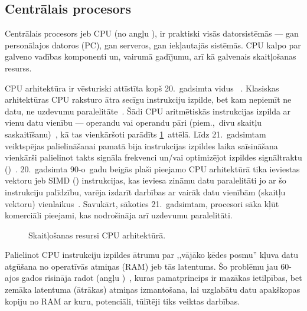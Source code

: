 \subsection{Centrālais procesors} \label{sec:cpu}
Centrālais procesors jeb CPU (no angļu ), ir
praktiski visās datorsistēmās --- gan personālajos datoros (PC), gan serveros,
gan iekļautajās sistēmās. CPU kalpo par galveno vadības komponenti un, vairumā
gadījumu, arī kā galvenais skaitļošanas resurss.

CPU arhitektūra ir vēsturiski attīstīta kopš 20.~gadsimta vidus~%
\cite{Flynn-arch}\cite{von-Neumann}.
Klasiskas arhitektūras CPU raksturo ātra secīgu instrukciju izpilde, 
bet kam nepiemīt ne datu, ne uzdevumu paralelitāte~\cite{Owens-GPU}.
Šādi CPU aritmētiskās instrukcijas izpilda ar vienu datu vienību --- 
operandu vai operandu pāri (piem.,~divu skaitļu saskaitīšanu)~\cite{Flynn-arch},
kā tas vienkāršoti parādīts \ref{fig:cpu-arch}~attēlā.
Līdz 21.~gadsimtam veiktspējas palielināšanai pamatā bija 
instrukcijas izpildes laika saīsināšana vienkārši 
palielinot takts signāla frekvenci
un/vai optimizējot izpildes signāltraktu ()~\cite{Flynn-arch}.
20.~gadsimta 90-o~gadu beigās plaši pieejamo CPU arhitektūrā tika ieviestas
vektoru jeb SIMD () 
instrukcijas, kas ieviesa zināmu datu paralelitāti jo ar šo instrukciju
palīdzību, varēja izdarīt darbības ar vairāk datu vienībām (skaitļu vektoru)
vienlaikus~\cite{SIMD}.
Savukārt, sākoties 21.~gadsimtam,  procesori
sāka kļūt komerciāli pieejami, kas nodrošināja arī uzdevumu paralelitāti.

\begin{figure}[tbh]
	\centering
	\def\svgscale{1.2}
	{}
	\caption{Skaitļošanas resursi CPU arhitektūrā.}
	\label{fig:cpu-arch}
\end{figure}

\label{sec:cache}
Palielinot CPU instrukciju izpildes ātrumu par
,,vājāko ķēdes posmu'' kļuva datu atgūšana no operatīvās atmiņas (RAM) jeb
tās latentums.
Šo problēmu jau 60-ajos gados risināja radot
 (angļu )~\cite[473.~lpp.]{Patterson},
kuras pamatprincips ir mazākas ietilpības, bet zemāka latentuma (ātrākas)
atmiņas izmantošana, lai uzglabātu datu apakškopas kopiju no
RAM ar kuru, potenciāli, tūlītēji tiks veiktas darbības.
\cite{Flynn-arch}\cite{Patterson2}\cite{Patterson}\cite{Cache}

